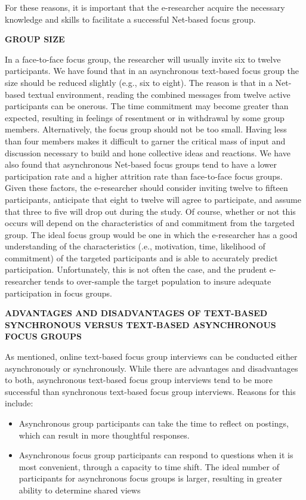 \documentclass [8pt]{beamer}
\begin{document}
\begin{frame}
\justifying
For these reasons, it is important that the e-researcher acquire the necessary knowledge and skills to facilitate a successful Net-based focus group.


\vspace{0.1cm}
{\large\textbf{GROUP SIZE}}


In a face-to-face focus group, the researcher will usually invite six to twelve participants. We have found that in an asynchronous text-based focus group the size should
be reduced slightly (e.g., six to eight). The reason is that in a Net-based textual environment, reading the combined messages from twelve active participants can be onerous. The time commitment may become greater than expected, resulting in feelings of resentment or in withdrawal by some group members. Alternatively, the focus group should not be too small. Having less than four members makes it difficult to garner the critical mass of input and discussion necessary to build and hone collective ideas and reactions. We have also found that asynchronous Net-based focus groups tend to have a lower participation rate and a higher attrition rate than face-to-face focus groups. Given these factors, the e-researcher should consider inviting twelve to fifteen participants, anticipate that eight to twelve will agree to participate, and assume that three to five will drop out during the study. Of course, whether or not this occurs will depend on the characteristics of and commitment from the targeted group. The ideal focus group would be one in which the e-researcher has a good understanding of the characteristics (.e., motivation, time, likelihood of commitment) of the targeted participants and is able to accurately predict participation. Unfortunately, this is not often the case, and the prudent e-researcher tends to over-sample the target population to insure adequate participation in focus groups.

\vspace{0.1cm}
{\large\textbf{ADVANTAGES AND DISADVANTAGES OF TEXT-BASED SYNCHRONOUS VERSUS TEXT-BASED ASYNCHRONOUS FOCUS GROUPS}}

As mentioned, online text-based focus group interviews can be conducted either asynchronously or synchronously. While there are advantages and disadvantages to both, asynchronous text-based focus group interviews tend to be more successful than synchronous text-based focus group interviews. Reasons for this include:
\begin{itemize}
	\item 
	Asynchronous group participants can take the time to reflect on postings, which can result in more thoughtful responses. 
	\item
	Asynchronous focus group participants can respond to questions when it is most convenient, through a capacity to time shift.
	The ideal number of participants for asynchronous focus groups is larger, resulting in greater ability to determine shared views 
\end{itemize}

\end{frame}
\end{document}

